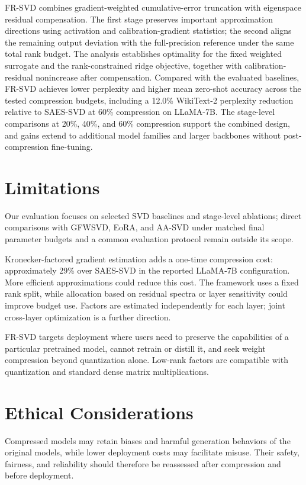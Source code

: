 \documentclass[11pt]{article}
\begin{document}
FR-SVD combines gradient-weighted cumulative-error truncation with eigenspace residual compensation. The first stage preserves important approximation directions using activation and calibration-gradient statistics; the second aligns the remaining output deviation with the full-precision reference under the same total rank budget. The analysis establishes optimality for the fixed weighted surrogate and the rank-constrained ridge objective, together with calibration-residual nonincrease after compensation. Compared with the evaluated baselines, FR-SVD achieves lower perplexity and higher mean zero-shot accuracy across the tested compression budgets, including a 12.0\% WikiText-2 perplexity reduction relative to SAES-SVD at 60\% compression on LLaMA-7B. The stage-level comparisons at 20\%, 40\%, and 60\% compression support the combined design, and gains extend to additional model families and larger backbones without post-compression fine-tuning.
\FloatBarrier
\label{main:end}

\section*{Limitations}

Our evaluation focuses on selected SVD baselines and stage-level ablations; direct comparisons with GFWSVD, EoRA, and AA-SVD under matched final parameter budgets and a common evaluation protocol remain outside its scope.

Kronecker-factored gradient estimation adds a one-time compression cost: approximately 29\% over SAES-SVD in the reported LLaMA-7B configuration. More efficient approximations could reduce this cost. The framework uses a fixed rank split, while allocation based on residual spectra or layer sensitivity could improve budget use. Factors are estimated independently for each layer; joint cross-layer optimization is a further direction.

FR-SVD targets deployment where users need to preserve the capabilities of a particular pretrained model, cannot retrain or distill it, and seek weight compression beyond quantization alone. Low-rank factors are compatible with quantization and standard dense matrix multiplications.

\section*{Ethical Considerations}

Compressed models may retain biases and harmful generation behaviors of the original models, while lower deployment costs may facilitate misuse. Their safety, fairness, and reliability should therefore be reassessed after compression and before deployment.


\clearpage
\appendix

\end{document}
